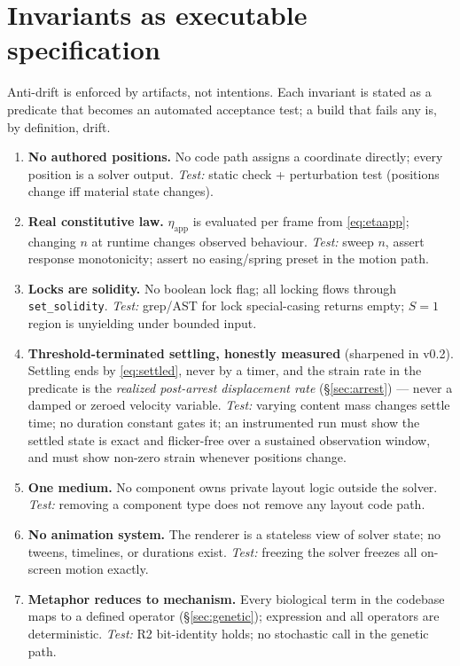 \documentclass[11pt]{article}
\begin{document}
\section{Invariants as executable specification}\label{sec:invariants}

Anti-drift is enforced by artifacts, not intentions. Each invariant is stated as a predicate that
becomes an automated acceptance test; a build that fails any is, by definition, drift.

\begin{enumerate}[leftmargin=1.8em,label=\textbf{I\arabic*.}]
  \item \textbf{No authored positions.} No code path assigns a coordinate directly; every position
  is a solver output. \emph{Test:} static check + perturbation test (positions change iff material
  state changes).
  \item \textbf{Real constitutive law.} $\eta_{\text{app}}$ is evaluated per frame from
  \eqref{eq:etaapp}; changing $n$ at runtime changes observed behaviour. \emph{Test:} sweep $n$,
  assert response monotonicity; assert no easing/spring preset in the motion path.
  \item \textbf{Locks are solidity.} No boolean lock flag; all locking flows through
  \texttt{set\_solidity}. \emph{Test:} grep/AST for lock special-casing returns empty; $S=1$ region
  is unyielding under bounded input.
  \item \textbf{Threshold-terminated settling, honestly measured} (sharpened in v0.2).
  Settling ends by \eqref{eq:settled}, never by a timer, and the strain rate in the predicate is
  the \emph{realized post-arrest displacement rate} (\S\ref{sec:arrest}) --- never a damped or
  zeroed velocity variable. \emph{Test:} varying content mass changes settle time; no duration
  constant gates it; an instrumented run must show the settled state is exact and flicker-free
  over a sustained observation window, and must show non-zero strain whenever positions change.
  \item \textbf{One medium.} No component owns private layout logic outside the solver. \emph{Test:}
  removing a component type does not remove any layout code path.
  \item \textbf{No animation system.} The renderer is a stateless view of solver state; no tweens,
  timelines, or durations exist. \emph{Test:} freezing the solver freezes all on-screen motion
  exactly.
  \item \textbf{Metaphor reduces to mechanism.} Every biological term in the codebase maps to a
  defined operator (\S\ref{sec:genetic}); expression and all operators are deterministic.
  \emph{Test:} R2 bit-identity holds; no stochastic call in the genetic path.
\end{enumerate}
\end{document}
